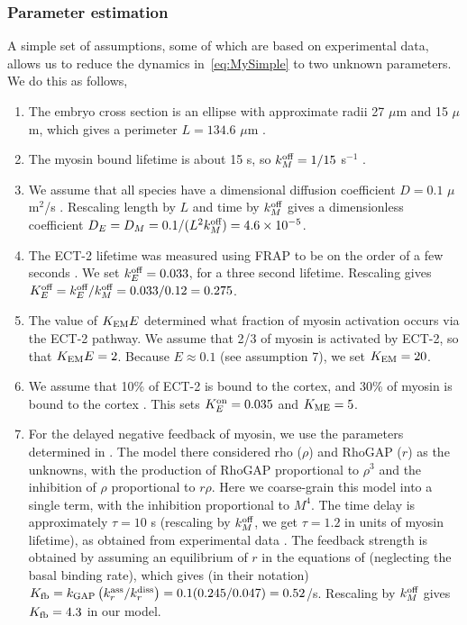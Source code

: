 \documentclass[11pt]{article}
\newcommand{\red}[1]{\color{red}#1\normalcolor}
\begin{document}
\subsubsection{Parameter estimation}
A simple set of assumptions, some of which are based on experimental data, allows us to reduce the dynamics in\ \eqref{eq:MySimple} to two unknown parameters. We do this as follows, 
\begin{enumerate}
\item The embryo cross section is an ellipse with approximate radii 27 $\mu$m and 15 $\mu$m, which gives a perimeter $L=134.6$ $\mu$m \cite{goehring2011polarization} .
\item \red{The myosin bound lifetime is about 15 s, so $k^\text{off}_M=1/15$ s$^{-1}$ \cite{gross2019guiding}. }
\item We assume that all species have a dimensional diffusion coefficient $D=0.1$ $\mu$m$^2$/s \cite{goehring2011polarization, gross2019guiding, robin2014single}. Rescaling length by $L$ and time by $k^\text{off}_M$ gives a dimensionless coefficient $D_E=D_M=0.1/(L^2 k^\text{off}_M)=4.6 \times 10^{-5}$. 
\item The ECT-2 lifetime was measured using FRAP to be on the order of a few seconds \cite{longhini2022aurora}. We set $k^\text{off}_E=0.033$, for a three second lifetime. Rescaling gives $K^\text{off}_E=k^\text{off}_E/k^\text{off}_M=0.033/0.12=0.275$. 
\item The value of $K_\text{EM} E$ determined what fraction of myosin activation occurs via the ECT-2 pathway. We assume that 2/3 of myosin is activated by ECT-2, so that $K_\text{EM} E=2$. Because $E \approx 0.1$ (see assumption 7), we set $K_\text{EM}=20$. 
\item We assume that 10\% of ECT-2 is bound to the cortex, and 30\% of myosin is bound to the cortex \cite[Fig.~S3j]{gross2019guiding}. This sets $K^\text{on}_E=0.035$ and $K_\text{ME} = 5$. 
\item For the delayed negative feedback of myosin, we use the parameters determined in \cite{michaux2018excitable}. The model there considered rho ($\rho$) and RhoGAP ($r$) as the unknowns, with the production of RhoGAP proportional to $\rho^3$ and the inhibition of $\rho$ proportional to $r \rho$. Here we coarse-grain this model into a single term, with the inhibition proportional to $M^4$. The time delay is approximately $\tau=10$ s (rescaling by $k^\text{off}_M$, we get $\tau=1.2$ in units of myosin lifetime), as obtained from experimental data \cite{michaux2018excitable}. The feedback strength is obtained by assuming an equilibrium of $r$ in the equations of \cite{michaux2018excitable} (neglecting the basal binding rate), which gives (in their notation) $K_\text{fb}=k_\text{GAP}\left(k_r^\text{ass}/k_r^\text{diss}\right)=0.1(0.245/0.047)=0.52$/s. Rescaling by $k^\text{off}_M$ gives $K_\text{fb}=4.3$ in our model. 
\end{enumerate}
\end{document}
